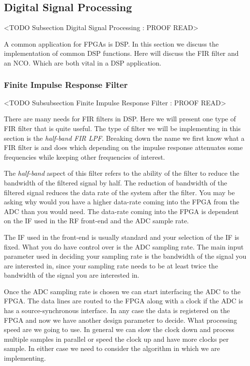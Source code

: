 \subsection{Digital Signal Processing}
	<TODO Subsection Digital Signal Processing : PROOF READ>
	
A common application for \ac{FPGA}s is \ac{DSP}. In this section we discuss the implementation of common \ac{DSP} functions. Here will discuss the \ac{FIR} filter and an \ac{NCO}. Which are both vital in a \ac{DSP} application. 

\subsubsection{Finite Impulse Response Filter}
	<TODO Subsubsection  Finite Impulse Response Filter : PROOF READ>

There are many needs for \ac{FIR} filters in \ac{DSP}. Here we will present one type of \ac{FIR} filter that is quite useful. The type of filter we will be implementing in this section is the \emph{half-band \ac{FIR} \ac{LPF}}. Breaking down the name we first know what a \ac{FIR} filter is and does which depending on the impulse response attenuates some frequencies while keeping other frequencies of interest. 

The \emph{half-band} aspect of this filter refers to the ability of the filter to reduce the bandwidth of the filtered signal by half. The reduction of bandwidth of the filtered signal reduces the data rate of the system after the filter. You may be asking why would you have a higher data-rate coming into the \ac{FPGA} from the \ac{ADC} than you would need. The data-rate coming into the \ac{FPGA} is dependent on the \ac{IF} used in the \ac{RF} front-end and the \ac{ADC} sample rate. 

The \ac{IF} used in the front-end is usually standard and your selection of the \ac{IF} is fixed. What you do have control over is the \ac{ADC} sampling rate. The main input parameter used in deciding your sampling rate is the bandwidth of the signal you are interested in, since your sampling rate needs to be at least twice the bandwidth of the signal you are interested in. 

Once the \ac{ADC} sampling rate is chosen we can start interfacing the \ac{ADC} to the \ac{FPGA}. The data lines are routed to the \ac{FPGA} along with a clock if the \ac{ADC} is has a source-synchronous interface. In any case the data is registered on the \ac{FPGA} and now we have another design parameter to decide. What processing speed are we going to use. In general we can slow the clock down and process multiple samples in parallel or speed the clock up and have more clocks per sample. In either case we need to consider the algorithm in which we are implementing. 

